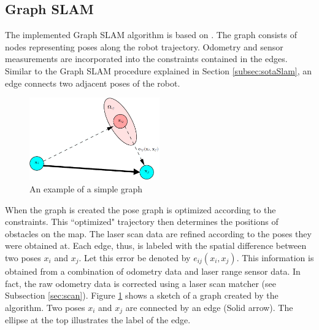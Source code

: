 \documentclass{ba-kecs}
\begin{document}
\subsection{Graph SLAM}
\label{sec:implSLAM}
The implemented Graph SLAM algorithm is based on \citep{Grisetti}. The graph consists of nodes representing poses along the robot trajectory. Odometry and sensor measurements are incorporated into the constraints contained in the edges. Similar to the Graph SLAM procedure explained in Section \ref{subsec:sotaSlam}, an edge connects two adjacent poses of the robot. 
\begin{figure}[h]
	\centering
		\includegraphics[width=0.50\textwidth]{figures/graph.png}
	\caption{An example of a simple graph \citep{Grisetti}}
	\label{fig:turtlebotexample_graph}
\end{figure}
When the graph is created the pose graph is optimized according to the constraints. This ``optimized" trajectory then determines the positions of obstacles on the map. The laser scan data are refined according to the poses they were obtained at. Each edge, thus, is labeled with the spatial difference between two poses \(x_i\) and \(x_j\). Let this error be denoted by \(e_{ij}(x_i, x_j)\). This information is obtained from a combination of odometry data and laser range sensor data. In fact, the raw odometry data is corrected using a laser scan matcher (see Subsection \ref{sec:scan}). 
Figure \ref{fig:turtlebotexample_graph} shows a sketch of a graph created by the algorithm. Two poses \(x_i\) and \(x_j\) are connected by an edge (Solid arrow). The ellipse at the top illustrates the label of the edge.
\end{document}
